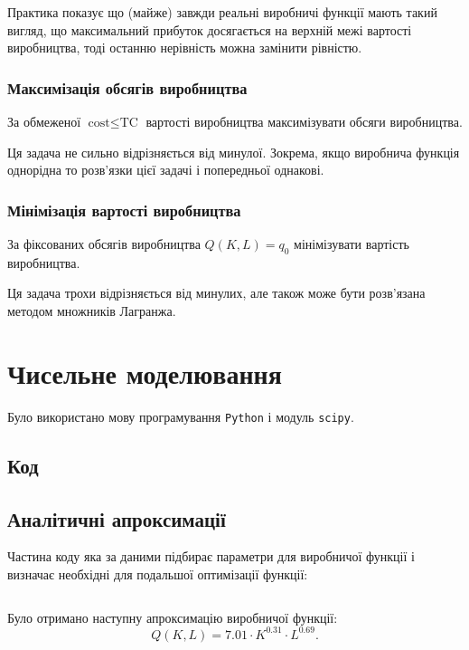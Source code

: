 Практика показує що (майже) завжди реальні виробничі функції мають такий вигляд, що максимальний прибуток досягається на верхній межі вартості виробництва, тоді останню нерівність можна замінити рівністю.

\subsubsection{Максимізація обсягів виробництва}

За обмеженої $\text{cost} \le \text{TC}$ вартості виробництва максимізувати обсяги виробництва. \medskip

Ця задача не сильно відрізняється від минулої. Зокрема, якщо виробнича функція однорідна то розв'язки цієї задачі і попередньої однакові.

\subsubsection{Мінімізація вартості виробництва}

За фіксованих обсягів виробництва $Q(K, L) = q_0$ мінімізувати вартість виробництва. \medskip

Ця задача трохи відрізняється від минулих, але також може бути розв'язана методом множників Лагранжа.

\section{Чисельне моделювання}

Було використано мову програмування \texttt{Python} і модуль \texttt{scipy}.

\subsection{Код}

\subsection{Аналітичні апроксимації}

Частина коду яка за даними підбирає параметри для виробничої функції і визначає необхідні для подальшої оптимізації функції:

\inputminted[lastline=52]{python}{labs/examples/4/py/all.py}

Було отримано наступну апроксимацію виробничої функції: \[ Q(K, L) = 7.01 \cdot K^{0.31} \cdot L^{0.69}. \]


